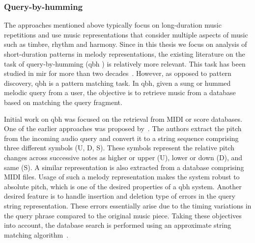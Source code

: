 

\subsubsection{Query-by-humming}
\label{sec:query_by_humming}

The approaches mentioned above typically focus on long-duration music repetitions  and use music representations that consider multiple aspects of music such as timbre, rhythm and harmony. Since in this thesis we focus on analysis of short-duration patterns in melody representations, the existing literature on the task of query-by-humming (\gls{qbh} ) is relatively more relevant. This task has been studied in \gls{mir} for more than two decades~\citep{ghias1995query,McNab1996}. However, as opposed to pattern discovery, \gls{qbh}  is a pattern matching task. In \gls{qbh}, given a sung or hummed melodic query from a user, the objective is to retrieve music from a database based on matching the query fragment. 

Initial work on \gls{qbh}  was focused on the retrieval from MIDI or score databases. One of the earlier approaches was proposed by~\cite{ghias1995query}. The authors extract the pitch from the incoming audio query and convert it to a string sequence comprising three different symbols (U, D, S). These symbols represent the relative pitch changes across successive notes as higher or upper (U), lower or down (D), and same (S). A similar representation is also extracted from a database comprising MIDI files. Usage of such a melody representation makes the system robust to absolute pitch, which is one of the desired properties of a \gls{qbh} system. Another desired feature is to handle insertion and deletion type of errors in the query string representation. These errors essentially arise due to the timing variations in the query phrase compared to the original music piece. Taking these objectives into account, the database search is performed using an approximate string matching algorithm~\citep{baeza1992fast}.

